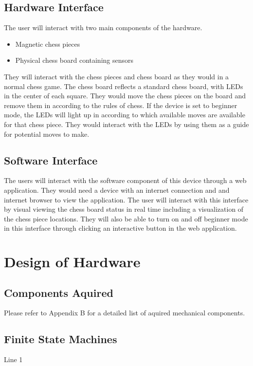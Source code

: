 \documentclass[12pt, titlepage]{article}
\begin{document}
\subsection*{Hardware Interface}
The user will interact with two main components of the hardware.
\begin{itemize}
  \item Magnetic chess pieces
  \item Physical chess board containing sensors
\end{itemize}
They will interact with the chess pieces and chess board as they would in a normal chess game. The chess board reflects a standard chess board, with 
LEDs in the center of each square. They would move the chess pieces on the board and remove them in according to the rules of chess. If the device
is set to beginner mode, the LEDs will light up in according to which available moves are available for that chess piece. They would interact with the LEDs
by using them as a guide for potential moves to make.

\subsection*{Software Interface}
The users will interact with the software component of this device through a web application. They would need a device with an internet connection and and internet browser
to view the application. The user will interact with this interface by visual viewing the chess board status in real time including a visualization of the chess piece locations.
They will also be able to turn on and off beginner mode in this interface through clicking an interactive button in the web application. 

\section{Design of Hardware}

\subsection*{Components Aquired}
Please refer to Appendix B for a detailed list of aquired mechanical components.

\subsection*{Finite State Machines}
Line 1 \\
\end{document}
